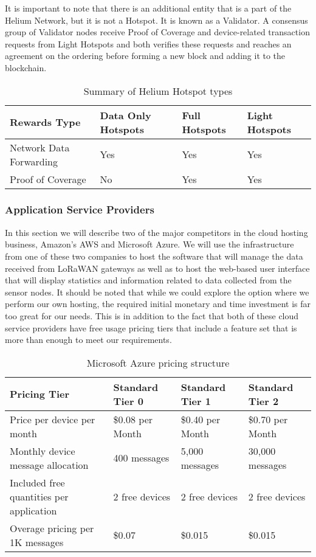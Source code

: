 It is important to note that there is an additional entity that is a part of the Helium Network, but it is not a Hotspot. It is known as a Validator. A consensus group of Validator nodes receive Proof of Coverage and device-related transaction requests from Light Hotspots and both verifies these requests and reaches an agreement on the ordering before forming a new block and adding it to the blockchain.

\begin{table}
\centering
\caption{Summary of Helium Hotspot types}
\begin{tabular}{|l|l|l|l|}
\hline
Rewards Type & Data Only Hotspots & Full Hotspots & Light Hotspots \\
\hline\hline
Network Data Forwarding & Yes & Yes & Yes \\\hline
Proof of Coverage & No & Yes & Yes \\\hline
\end{tabular}
\label{tab:helium-hotspot-classes}
\end{table}

\subsubsection{Application Service Providers}
In this section we will describe two of the major competitors in the cloud hosting business, Amazon's AWS and Microsoft Azure. We will use the infrastructure from one of these two companies to host the software that will manage the data received from LoRaWAN gateways as well as to host the web-based user interface that will display statistics and information related to data collected from the sensor nodes. It should be noted that while we could explore the option where we perform our own hosting, the required initial monetary and time investment is far too great for our needs. This is in addition to the fact that both of these cloud service providers have free usage pricing tiers that include a feature set that is more than enough to meet our requirements.

\begin{table}[t]
\centering\footnotesize
\caption{Microsoft Azure pricing structure}
\begin{tabular}{|l|l|l|l|}
\hline
Pricing Tier & Standard Tier 0 & Standard Tier 1 & Standard Tier 2 \\
\hline\hline
Price per device per month & \$0.08 per Month & \$0.40 per Month & \$0.70 per Month \\\hline
Monthly device message allocation & 400 messages & 5,000 messages & 30,000 messages \\\hline
Included free quantities per application & 2 free devices & 2 free devices  & 2 free devices  \\\hline
Overage pricing per 1K messages & \$0.07 & \$0.015 & \$0.015 \\\hline
\end{tabular}
\label{tab:azure-pricing}
\end{table}

